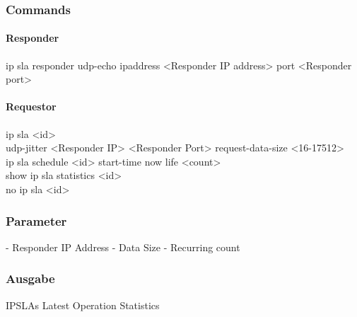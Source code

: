 \documentclass[a4,12pt]{scrartcl}
\begin{document}
\subsubsection{Commands}
\paragraph{Responder}\hfill

\noindent ip sla responder udp-echo ipaddress <Responder IP address> port <Responder port>\\

\paragraph{Requestor}\hfill

\noindent ip sla <id>\\
udp-jitter <Responder IP> <Responder Port>
request-data-size <16-17512>\\
ip sla schedule <id> start-time now life <count>\\
show ip sla statistics <id>\\
no ip sla <id>
\subsubsection{Parameter}
- Responder IP Address
- Data Size
- Recurring count
\subsubsection{Ausgabe}
IPSLAs Latest Operation Statistics\\
\end{document}
